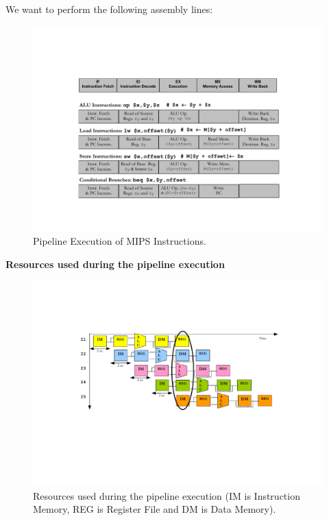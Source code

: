 \documentclass[a4paper]{article}
\newcommand{\highspace}{\vspace{1.2em}\noindent}
\begin{document}
    \highspace
    We want to perform the following assembly lines:
    
    \begin{figure}[!htp]
        \centering
        \includegraphics[width=\textwidth]{img/sequential-vs-pipelining-2.pdf}
        \caption{Pipeline Execution of MIPS Instructions.\cite{pipelining-slides}}
    \end{figure}

    \newpage

    \begin{center}
        \textcolor{Red3}{\textbf{Resources used during the pipeline execution}}
    \end{center}
    \begin{figure}[!htp]
        \centering
        \includegraphics[width=\textwidth]{img/sequential-vs-pipelining-3.pdf}
        \caption{Resources used during the pipeline execution (IM is Instruction Memory, REG is Register File and DM is Data Memory).\cite{pipelining-slides}}
    \end{figure}
\end{document}
